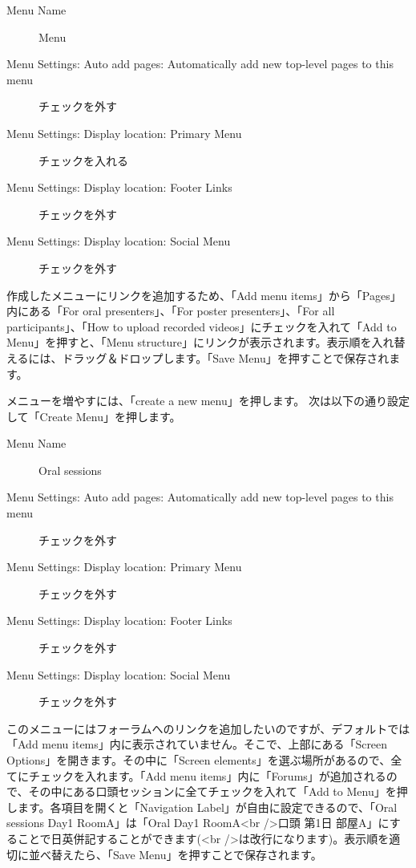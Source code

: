 \documentclass[titlepage,10pt,a4paper,uplatex]{jsbook}
\begin{document}
\begin{description}
\item[Menu Name] Menu
\item[Menu Settings: Auto add pages: Automatically add new top-level pages to this menu] チェックを外す
\item[Menu Settings: Display location: Primary Menu] チェックを入れる
\item[Menu Settings: Display location: Footer Links] チェックを外す
\item[Menu Settings: Display location: Social Menu] チェックを外す
\end{description}

作成したメニューにリンクを追加するため、「Add menu items」から「Pages」内にある「For oral presenters」、「For poster presenters」、「For all participants」、「How to upload recorded videos」にチェックを入れて「Add to Menu」を押すと、「Menu structure」にリンクが表示されます。表示順を入れ替えるには、ドラッグ＆ドロップします。「Save Menu」を押すことで保存されます。

メニューを増やすには、「create a new menu」を押します。
次は以下の通り設定して「Create Menu」を押します。

\begin{description}
\item[Menu Name] Oral sessions
\item[Menu Settings: Auto add pages: Automatically add new top-level pages to this menu] チェックを外す
\item[Menu Settings: Display location: Primary Menu] チェックを外す
\item[Menu Settings: Display location: Footer Links] チェックを外す
\item[Menu Settings: Display location: Social Menu] チェックを外す
\end{description}

このメニューにはフォーラムへのリンクを追加したいのですが、デフォルトでは「Add menu items」内に表示されていません。そこで、上部にある「Screen Options」を開きます。その中に「Screen elements」を選ぶ場所があるので、全てにチェックを入れます。「Add menu items」内に「Forums」が追加されるので、その中にある口頭セッションに全てチェックを入れて「Add to Menu」を押します。各項目を開くと「Navigation Label」が自由に設定できるので、「Oral sessions Day1 RoomA」は「Oral Day1 RoomA{\textless}br /{\textgreater}口頭 第1日 部屋A」にすることで日英併記することができます({\textless}br /{\textgreater}は改行になります)。表示順を適切に並べ替えたら、「Save Menu」を押すことで保存されます。
\end{document}
